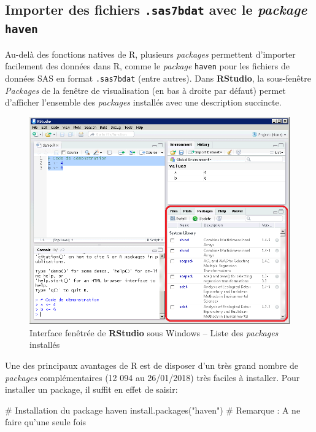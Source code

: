 \documentclass[12pt,twosided, notitlepage]{book}
\newenvironment{Shaded}{}{}
\newcommand{\KeywordTok}[1]{\textcolor[rgb]{0.00,0.00,1.00}{#1}}
\newcommand{\StringTok}[1]{\textcolor[rgb]{0.00,0.50,0.50}{#1}}
\newcommand{\CommentTok}[1]{\textcolor[rgb]{0.00,0.50,0.00}{#1}}
\newcommand{\NormalTok}[1]{#1}
\renewenvironment{Shaded}{\begin{snugshade}}{\end{snugshade}}
\begin{document}
\subsection{\texorpdfstring{Importer des fichiers \texttt{.sas7bdat}
avec le \emph{package}
\texttt{haven}}{Importer des fichiers .sas7bdat avec le package haven}}\label{importer-des-fichiers-.sas7bdat-avec-le-package-haven}

Au-delà des fonctions natives de R, plusieurs \emph{packages} permettent
d'importer facilement des données dans R, comme le \emph{package}
\texttt{haven} pour les fichiers de données SAS en format
\texttt{.sas7bdat} (entre autres). Dans \textbf{RStudio}, la
sous-fenêtre \emph{Packages} de la fenêtre de visualisation (en bas à
droite par défaut) permet d'afficher l'ensemble des \emph{packages}
installés avec une description succincte.

\begin{figure}
\centering
\includegraphics{../figures/Interface_RStudio_3.png}
\caption{Interface fenêtrée de \textbf{RStudio} sous Windows -- Liste
des \emph{packages} installés}
\end{figure}

Une des principaux avantages de R est de disposer d'un très grand nombre
de \emph{packages} complémentaires (12 094 au 26/01/2018) très faciles à
installer. Pour installer un package, il suffit en effet de saisir:

\begin{Shaded}
\begin{Highlighting}[]
\CommentTok{# Installation du package haven}
\KeywordTok{install.packages}\NormalTok{(}\StringTok{"haven"}\NormalTok{)}
\CommentTok{# Remarque : A ne faire qu'une seule fois}
\end{Highlighting}
\end{Shaded}
\end{document}
